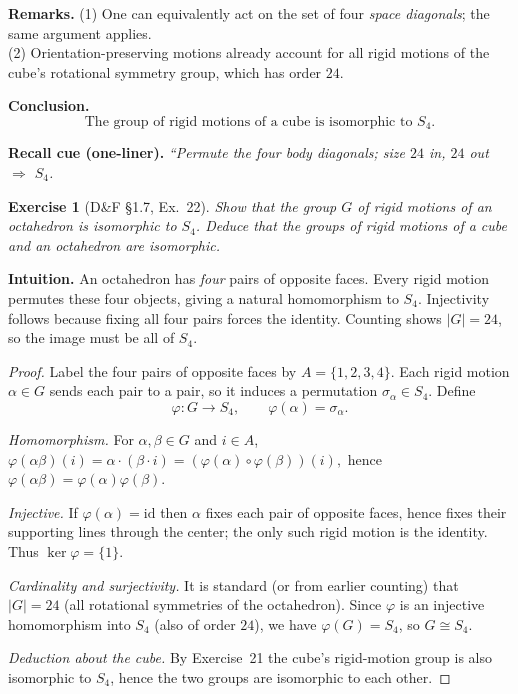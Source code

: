 \documentclass[12pt]{article}
\newtheorem{exercise}[theorem]{Exercise}
\theoremstyle{definition}
\begin{document}
\noindent\textbf{Remarks.}
(1) One can equivalently act on the set of four \emph{space diagonals}; the same argument applies.\\
(2) Orientation-preserving motions already account for all rigid motions of the cube’s rotational symmetry group, which has order $24$.

\medskip
\noindent\textbf{Conclusion.}
\[
\boxed{\ \text{The group of rigid motions of a cube is isomorphic to }S_4.\ }
\]

\medskip
\noindent\textbf{Recall cue (one-liner).} \emph{“Permute the four body diagonals; size $24$ in, $24$ out $\Rightarrow$ $S_4$.}

\newpage

\begin{exercise}[D\&F §1.7, Ex.~22]
Show that the group $G$ of rigid motions of an octahedron is isomorphic to $S_4$.
Deduce that the groups of rigid motions of a cube and an octahedron are isomorphic.
\end{exercise}

\dotfill

\noindent\textbf{Intuition.}
An octahedron has \emph{four} pairs of opposite faces.
Every rigid motion permutes these four objects, giving a natural homomorphism
to $S_4$. Injectivity follows because fixing all four pairs forces the identity.
Counting shows $|G|=24$, so the image must be all of $S_4$.

\dotfill

\begin{proof}
Label the four pairs of opposite faces by $A=\{1,2,3,4\}$.
Each rigid motion $\alpha\in G$ sends each pair to a pair, so it induces a permutation
$\sigma_\alpha\in S_4$. Define
\[
\varphi:G\to S_4,\qquad \varphi(\alpha)=\sigma_\alpha.
\]

\smallskip
\noindent\emph{Homomorphism.}
For $\alpha,\beta\in G$ and $i\in A$,
\(
\varphi(\alpha\beta)(i)=\alpha\cdot(\beta\cdot i)
=(\varphi(\alpha)\circ\varphi(\beta))(i),
\)
hence $\varphi(\alpha\beta)=\varphi(\alpha)\varphi(\beta)$.

\smallskip
\noindent\emph{Injective.}
If $\varphi(\alpha)=\mathrm{id}$ then $\alpha$ fixes each pair of opposite faces,
hence fixes their supporting lines through the center; the only such rigid motion is
the identity. Thus $\ker\varphi=\{1\}$.

\smallskip
\noindent\emph{Cardinality and surjectivity.}
It is standard (or from earlier counting) that $|G|=24$ (all rotational symmetries of the octahedron).
Since $\varphi$ is an injective homomorphism into $S_4$ (also of order $24$), we have
$\varphi(G)=S_4$, so $G\cong S_4$.

\smallskip
\noindent\emph{Deduction about the cube.}
By Exercise~21 the cube’s rigid-motion group is also isomorphic to $S_4$, hence the
two groups are isomorphic to each other.
\end{proof}
\end{document}
